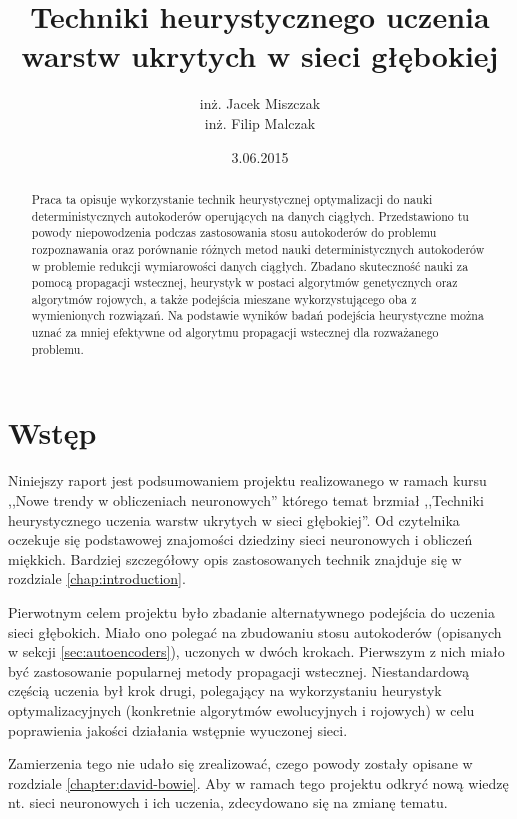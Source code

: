 \documentclass[11pt,a4paper,oneside]{report}
\begin{document}
\title{Techniki heurystycznego uczenia warstw ukrytych w sieci głębokiej}
\author{inż. Jacek Miszczak \\ inż. Filip Malczak}
\date{3.06.2015}
\maketitle

\begin{abstract}
Praca ta opisuje wykorzystanie technik heurystycznej optymalizacji do nauki deterministycznych autokoderów operujących na danych ciągłych. Przedstawiono tu powody niepowodzenia podczas zastosowania stosu autokoderów do problemu rozpoznawania oraz porównanie różnych metod nauki deterministycznych autokoderów w problemie redukcji wymiarowości danych ciągłych. Zbadano skuteczność nauki za pomocą propagacji wstecznej, heurystyk w postaci algorytmów genetycznych oraz algorytmów rojowych, a także podejścia mieszane wykorzystującego oba z wymienionych rozwiązań. Na podstawie wyników badań podejścia heurystyczne można uznać za mniej efektywne od algorytmu propagacji wstecznej dla rozważanego problemu.

\end{abstract}

\tableofcontents

\chapter{Wstęp}

Niniejszy raport jest podsumowaniem projektu realizowanego w ramach kursu ,,Nowe trendy w obliczeniach neuronowych'' którego temat brzmiał ,,Techniki heurystycznego uczenia warstw ukrytych w sieci głębokiej''. Od czytelnika oczekuje się podstawowej znajomości dziedziny sieci neuronowych i obliczeń miękkich. Bardziej szczegółowy opis zastosowanych technik znajduje się w rozdziale \ref{chap:introduction}.

Pierwotnym celem projektu było zbadanie alternatywnego podejścia do uczenia sieci głębokich. Miało ono polegać na zbudowaniu stosu autokoderów (opisanych w sekcji \ref{sec:autoencoders}), uczonych w dwóch krokach. Pierwszym z nich miało być zastosowanie popularnej metody propagacji wstecznej. Niestandardową częścią uczenia był krok drugi, polegający na wykorzystaniu heurystyk optymalizacyjnych (konkretnie algorytmów ewolucyjnych i rojowych) w celu poprawienia jakości działania wstępnie wyuczonej sieci.

Zamierzenia tego nie udało się zrealizować, czego powody zostały opisane w rozdziale \ref{chapter:david-bowie}. Aby w ramach tego projektu odkryć nową wiedzę nt. sieci neuronowych i ich uczenia, zdecydowano się na zmianę tematu.
\end{document}

